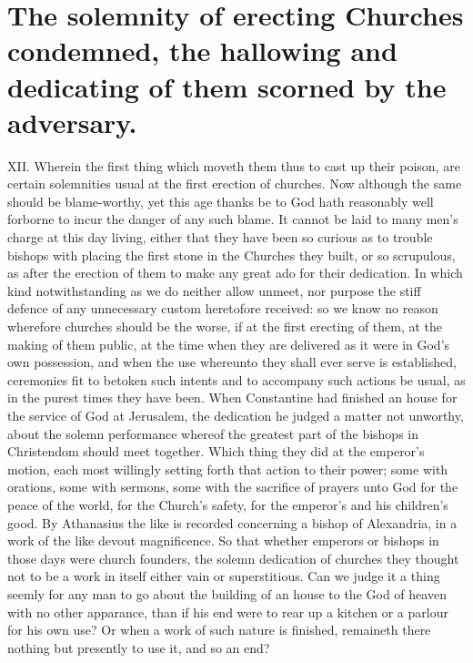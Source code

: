 \section*{The solemnity of erecting Churches condemned, the hallowing and dedicating of them scorned by the adversary.}
XII. Wherein the first thing which moveth them thus to cast up their poison, are certain solemnities usual at the first erection of churches. Now although the same should be blame-worthy, yet this age thanks be to God hath reasonably well forborne to incur the danger of any such blame. It cannot be laid to many men’s charge at this day living, either that they have been so curious as to trouble bishops with placing the first stone in the Churches they built, or so scrupulous, as after the erection of them to make any great ado for their dedication. In which kind notwithstanding as we do neither allow unmeet, nor purpose the stiff defence of any unnecessary custom heretofore received: so we know  no reason wherefore churches should be the worse, if at the first erecting of them, at the making of them public, at the time when they are delivered as it were in God’s own possession, and when the use whereunto they shall ever serve is established, ceremonies fit to betoken such intents and to accompany such actions be usual, as in the purest times they have been. When Constantine had finished an house for the service of God at Jerusalem, the dedication he judged a matter not unworthy, about the solemn performance whereof the greatest part of the bishops in Christendom should meet together. Which thing they did at the emperor’s motion, each most willingly setting forth that action to their power; some with orations, some with sermons, some with the sacrifice of prayers unto God for the peace of the world, for the Church’s safety, for the emperor’s and his children’s good. By Athanasius the like is recorded concerning a bishop of Alexandria, in a work of the like devout magnificence. So that whether emperors or bishops in those days were church founders, the solemn dedication of churches they thought not to be a work in itself either vain or superstitious. Can we judge it a thing seemly for any man to go about the building of an house to  the God of heaven with no other apparance, than if his end were to rear up a kitchen or a parlour for his own use? Or when a work of such nature is finished, remaineth there nothing but presently to use it, and so an end?
